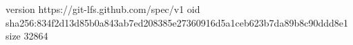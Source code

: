 version https://git-lfs.github.com/spec/v1
oid sha256:834f2d13d85b0a843ab7ed208385e27360916d5a1ceb623b7da89b8c90ddd8e1
size 32864
